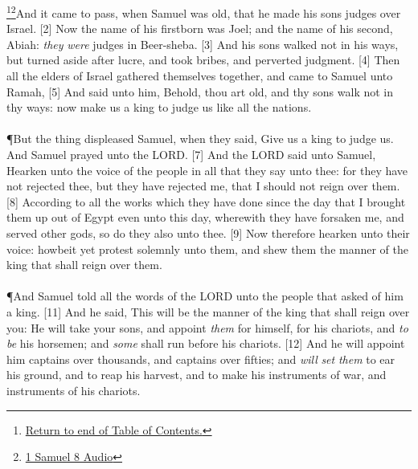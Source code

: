 \footnote{\textcolor[cmyk]{0.99998,1,0,0}{\hyperlink{TOC}{Return to end of Table of Contents.}}}\footnote{\href{https://audiobible.com/bible/1_samuel_8.html}{\textcolor[cmyk]{0.99998,1,0,0}{1 Samuel 8 Audio}}}\textcolor[cmyk]{0.99998,1,0,0}{And it came to pass, when Samuel was old, that he made his sons judges over Israel.}
[2] \textcolor[cmyk]{0.99998,1,0,0}{Now the name of his firstborn was Joel; and the name of his second, Abiah: \emph{they} \emph{were} judges in Beer-sheba.}
[3] \textcolor[cmyk]{0.99998,1,0,0}{And his sons walked not in his ways, but turned aside after lucre, and took bribes, and perverted judgment.}
[4] \textcolor[cmyk]{0.99998,1,0,0}{Then all the elders of Israel gathered themselves together, and came to Samuel unto Ramah,}
[5] \textcolor[cmyk]{0.99998,1,0,0}{And said unto him, Behold, thou art old, and thy sons walk not in thy ways: now make us a king to judge us like all the nations.}\\
\\
\P \textcolor[cmyk]{0.99998,1,0,0}{But the thing displeased Samuel, when they said, Give us a king to judge us. And Samuel prayed unto the LORD.}
[7] \textcolor[cmyk]{0.99998,1,0,0}{And the LORD said unto Samuel, Hearken unto the voice of the people in all that they say unto thee: for they have not rejected thee, but they have rejected me, that I should not reign over them.}
[8] \textcolor[cmyk]{0.99998,1,0,0}{According to all the works which they have done since the day that I brought them up out of Egypt even unto this day, wherewith they have forsaken me, and served other gods, so do they also unto thee.}
[9] \textcolor[cmyk]{0.99998,1,0,0}{Now therefore hearken unto their voice: howbeit yet protest solemnly unto them, and shew them the manner of the king that shall reign over them.}\\
\\
\P \textcolor[cmyk]{0.99998,1,0,0}{And Samuel told all the words of the LORD unto the people that asked of him a king.}
[11] \textcolor[cmyk]{0.99998,1,0,0}{And he said, This will be the manner of the king that shall reign over you: He will take your sons, and appoint \emph{them} for himself, for his chariots, and \emph{to} \emph{be} his horsemen; and \emph{some} shall run before his chariots.}
[12] \textcolor[cmyk]{0.99998,1,0,0}{And he will appoint him captains over thousands, and captains over fifties; and \emph{will} \emph{set} \emph{them} to ear his ground, and to reap his harvest, and to make his instruments of war, and instruments of his chariots.}
